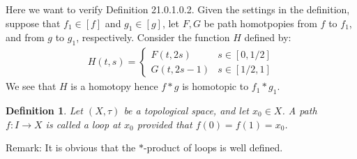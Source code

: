 \documentclass[11pt]{book}
\theoremstyle{break}
\theoremstyle{break}
\newtheorem{defn}{Definition}[corL]
\newcommand{\remark}{\color{blue}Remark: \color{black}}
\begin{document}
Here we want to verify Definition 21.0.1.0.2. Given the settings in the definition, suppose that $f_1 \in [f]$ and $g_1\in [g]$, let $F, G$ be path homotpopies from $f$ to $f_1$, and from $g$ to $g_1$, respectively. Consider the function $H$ defined by: 
\begin{align*}
H(t,s) = \begin{cases}
F(t, 2s) & s \in [0,1/2] \\ 
G(t, 2s-1) & s \in [1/2,1]
\end{cases}
\end{align*}
We see that $H$ is a homotopy hence $f*g$ is homotopic to $f_1*g_1$.\\

\begin{defn}
Let $(X,\tau)$ be a topological space, and let $x_0 \in X$. A path $f:I \to X$ is called a loop at $x_0$ provided that $f(0) = f(1) = x_0$.\end{defn}

\remark It is obvious that the $*$-product of loops is well defined.
\end{document}
